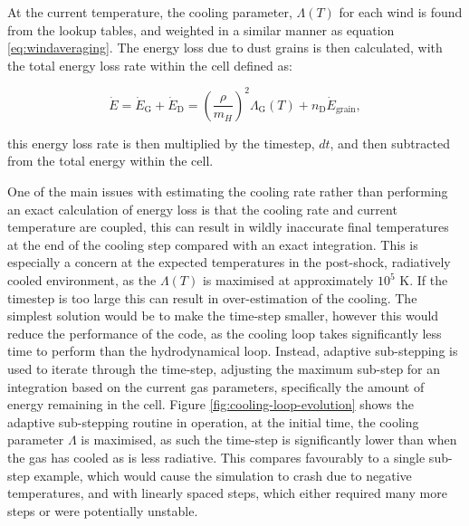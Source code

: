 \noindent
At the current temperature, the cooling parameter, $\Lambda(T)$ for each wind is found from the lookup tables, and weighted in a similar manner as equation \ref{eq:windaveraging}. The energy loss due to dust grains is then calculated, with the total energy loss rate within the cell defined as:

\begin{equation}
  \dot E = \dot{E}_\text{G} + \dot{E}_\text{D} = \left(\frac{\rho}{m_H}\right)^2 \Lambda_\text{G}(T) + n_\text{D} \dot{E}_\text{grain},
\end{equation}

\noindent
this energy loss rate is then multiplied by the timestep, $dt$, and then subtracted from the total energy within the cell. 


One of the main issues with estimating the cooling rate rather than performing an exact calculation of energy loss is that the cooling rate and current temperature are coupled, this can result in wildly inaccurate final temperatures at the end of the cooling step compared with an exact integration.
This is especially a concern at the expected temperatures in the post-shock, radiatively cooled environment, as the $\Lambda(T)$ is maximised at approximately $10^5$ \si{\kelvin}. If the timestep is too large this can result in over-estimation of the cooling.
The simplest solution would be to make the time-step smaller, however this would reduce the performance of the code, as the cooling loop takes significantly less time to perform than the hydrodynamical loop.
Instead, adaptive sub-stepping is used to iterate through the time-step, adjusting the maximum sub-step for an integration based on the current gas parameters, specifically the amount of energy remaining in the cell.
Figure \ref{fig:cooling-loop-evolution} shows the adaptive sub-stepping routine in operation, at the initial time, the cooling parameter $\Lambda$ is maximised, as such the time-step is significantly lower than when the gas has cooled as is less radiative.
This compares favourably to a single sub-step example, which would cause the simulation to crash due to negative temperatures, and with linearly spaced steps, which either required many more steps or were potentially unstable.

